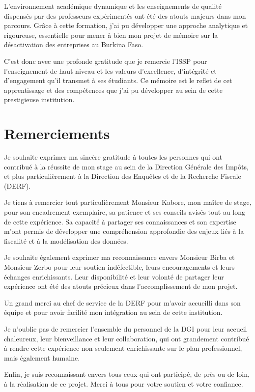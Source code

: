 \documentclass[a4paper,12pt]{report}
\begin{document}
L'environnement académique dynamique et les enseignements de qualité dispensés par des professeurs expérimentés ont été des atouts majeurs dans mon parcours. Grâce à cette formation, j'ai pu développer une approche analytique et rigoureuse, essentielle pour mener à bien mon projet de mémoire sur la désactivation des entreprises au Burkina Faso.

C'est donc avec une profonde gratitude que je remercie l'ISSP pour l'enseignement de haut niveau et les valeurs d'excellence, d'intégrité et d'engagement qu'il transmet à ses étudiants. Ce mémoire est le reflet de cet apprentissage et des compétences que j'ai pu développer au sein de cette prestigieuse institution.
\chapter*{Remerciements}

Je souhaite exprimer ma sincère gratitude à toutes les personnes qui ont contribué à la réussite de mon stage au sein de la Direction Générale des Impôts, et plus particulièrement à la Direction des Enquêtes et de la Recherche Fiscale (DERF).

Je tiens à remercier tout particulièrement Monsieur Kabore, mon maître de stage, pour son encadrement exemplaire, sa patience et ses conseils avisés tout au long de cette expérience. Sa capacité à partager ses connaissances et son expertise m'ont permis de développer une compréhension approfondie des enjeux liés à la fiscalité et à la modélisation des données.

Je souhaite également exprimer ma reconnaissance envers Monsieur Birba et Monsieur Zerbo pour leur soutien indéfectible, leurs encouragements et leurs échanges enrichissants. Leur disponibilité et leur volonté de partager leur expérience ont été des atouts précieux dans l'accomplissement de mon projet.

Un grand merci au chef de service de la DERF pour m'avoir accueilli dans son équipe et pour avoir facilité mon intégration au sein de cette institution. 

Je n'oublie pas de remercier l'ensemble du personnel de la DGI pour leur accueil chaleureux, leur bienveillance et leur collaboration, qui ont grandement contribué à rendre cette expérience non seulement enrichissante sur le plan professionnel, mais également humaine.

Enfin, je suis reconnaissant envers tous ceux qui ont participé, de près ou de loin, à la réalisation de ce projet. Merci à tous pour votre soutien et votre confiance.
\end{document}
